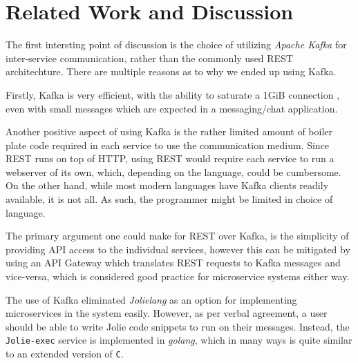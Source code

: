 
\section{Related Work and Discussion}\label{sec:relatedWorkAndDiscussion}


The first intersting point of discussion is the choice of utilizing \textit{Apache Kafka} for inter-service communication, rather than the commonly used REST architechture. 
There are multiple reasons as to why we ended up using Kafka. 

Firstly, Kafka is very efficient, with the ability to saturate a 1GiB connection \cite{kafkaEfficiency}, even with small messages which are expected in a messaging/chat application.

Another positive aspect of using Kafka is the rather limited amount of boiler plate code required in each service to use the communication medium. Since REST runs on top of HTTP, using REST would require each service to run a webserver of its own, which, depending on the language, could be cumbersome.
On the other hand, while most modern languages have Kafka clients readily available, it is not all. As such, the programmer might be limited in choice of language.

The primary argument one could make for REST over Kafka, is the simplicity of providing API access to the individual services, however this can be mitigated by using an API Gateway which translates REST requests to Kafka messages and vice-versa, which is considered good practice for microservice systems either way.

\vspace*{11pt}

The use of Kafka eliminated \textit{Jolielang} as an option for implementing microservices in the system easily. However, as per verbal agreement, a user should be able to write Jolie code snippets to run on their messages.
Instead, the \texttt{Jolie-exec} service is implemented in \textit{golang}, which in many ways is quite similar to an extended version of \texttt{C}.

